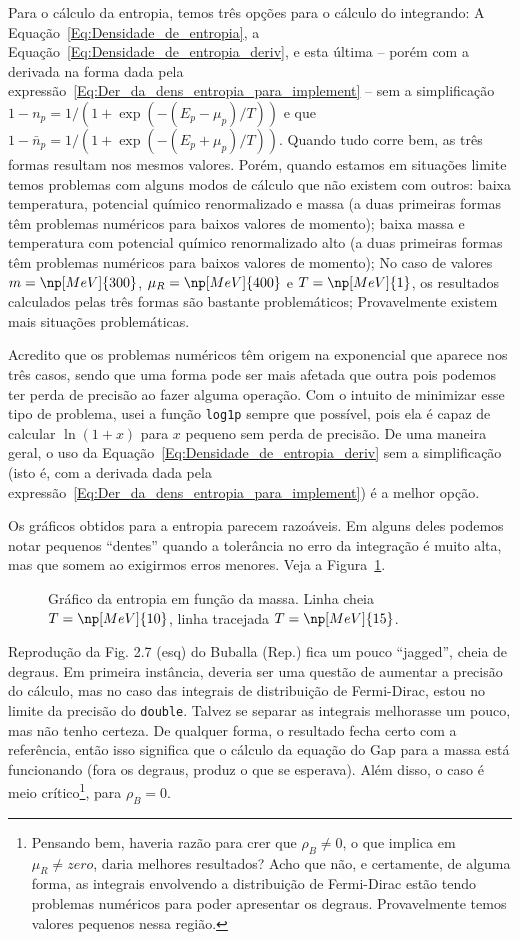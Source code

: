 Para o cálculo da entropia, temos três opções para o cálculo do integrando: A Equação~\eqref{Eq:Densidade_de_entropia}, a Equação~\eqref{Eq:Densidade_de_entropia_deriv}, e esta última -- porém com a derivada na forma dada pela expressão~\eqref{Eq:Der_da_dens_entropia_para_implement} -- sem a simplificação $1 - n_p = 1/(1 + \exp(-(E_p - \mu_p)/T))$ e que $1 - \bar{n}_p = 1/(1 + \exp(-(E_p + \mu_p)/T))$. Quando tudo corre bem, as três formas resultam nos mesmos valores. Porém, quando estamos em situações limite temos problemas com alguns modos de cálculo que não existem com outros: baixa temperatura, potencial químico renormalizado e massa (a duas primeiras formas têm problemas numéricos para baixos valores de momento); baixa massa e temperatura com potencial químico renormalizado alto (a duas primeiras formas têm problemas numéricos para baixos valores de momento); No caso de valores $m = \np[MeV]{300}$, $\mu_R = \np[MeV]{400}$ e $T = \np[MeV]{1}$, os resultados calculados pelas três formas são bastante problemáticos; Provavelmente existem mais situações problemáticas.

Acredito que os problemas numéricos têm origem na exponencial que aparece nos três casos, sendo que uma forma pode ser mais afetada que outra pois podemos ter perda de precisão ao fazer alguma operação. Com o intuito de minimizar esse tipo de problema, usei a função \texttt{log1p} sempre que possível, pois ela é capaz de calcular $\ln(1 + x)$ para $x$ pequeno sem perda de precisão. De uma maneira geral, o uso da Equação~\eqref{Eq:Densidade_de_entropia_deriv} sem a simplificação (isto é, com a derivada dada pela expressão~\eqref{Eq:Der_da_dens_entropia_para_implement}) é a melhor opção.

Os gráficos obtidos para a entropia parecem razoáveis. Em alguns deles podemos notar pequenos ``dentes'' quando a tolerância no erro da integração é muito alta, mas que somem ao exigirmos erros menores. Veja a Figura~\ref{Fig:Entropia}.

\begin{figure}
	
	\caption{Gráfico da entropia em função da massa. Linha cheia $T = \np[MeV]{10}$, linha tracejada $T = \np[MeV]{15}$. \protect}
	\label{Fig:Entropia}
\end{figure}

Reprodução da Fig. 2.7 (esq) do Buballa (Rep.) fica um pouco ``jagged'', cheia de degraus. Em primeira instância, deveria ser uma questão de aumentar a precisão do cálculo, mas no caso das integrais de distribuição de Fermi-Dirac, estou no limite da precisão do \texttt{double}. Talvez se separar as integrais melhorasse um pouco, mas não tenho certeza. De qualquer forma, o resultado fecha certo com a referência, então isso significa que o cálculo da equação do Gap para a massa está funcionando (fora os degraus, produz o que se esperava). Além disso, o caso é meio crítico\footnote{Pensando bem, haveria razão para crer que $\rho_B \neq 0$, o que implica em $\mu_R \neq zero$, daria melhores resultados? Acho que não, e certamente, de alguma forma, as integrais envolvendo a distribuição de Fermi-Dirac estão tendo problemas numéricos para poder apresentar os degraus. Provavelmente temos valores pequenos nessa região.}, para $\rho_B = 0$. 

